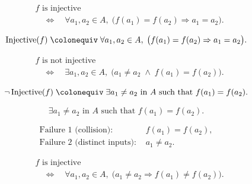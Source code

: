 \begin{remark*}
\[
\begin{aligned}
&f \text{ is injective} \\
&\quad\Longleftrightarrow\quad
\forall a_1, a_2 \in A,\;
\bigl(f(a_1) = f(a_2) \Rightarrow a_1 = a_2\bigr).
\end{aligned}
\]
\end{remark*}

\begin{remark*}
\[
\operatorname{Injective}(f)
\;\colonequiv\;
\forall a_1, a_2 \in A,\;
\bigl(f(a_1) = f(a_2) \Rightarrow a_1 = a_2\bigr).
\]
\end{remark*}

\begin{remark*}
\[
\begin{aligned}
&f \text{ is not injective} \\
&\quad\Longleftrightarrow\quad
\exists a_1, a_2 \in A,\;
\bigl(a_1 \ne a_2 \;\land\; f(a_1) = f(a_2)\bigr).
\end{aligned}
\]
\end{remark*}

\begin{remark*}
\[
\neg \operatorname{Injective}(f)
\;\colonequiv\;
\exists a_1 \ne a_2 \text{ in } A
\text{ such that } f(a_1) = f(a_2).
\]
\end{remark*}

\begin{remark*}
\[
\exists a_1 \ne a_2 \text{ in } A
\text{ such that } f(a_1) = f(a_2).
\]
\end{remark*}

\begin{remark*}
\[
\begin{aligned}
\text{Failure 1 (collision): } 
&f(a_1) = f(a_2), \\
\text{Failure 2 (distinct inputs): } 
&a_1 \ne a_2.
\end{aligned}
\]
\end{remark*}

\begin{remark*}
\[
\begin{aligned}
&f \text{ is injective} \\
&\quad\Longleftrightarrow\quad
\forall a_1, a_2 \in A,\;
\bigl(a_1 \ne a_2 \Rightarrow f(a_1) \ne f(a_2)\bigr).
\end{aligned}
\]
\end{remark*}

